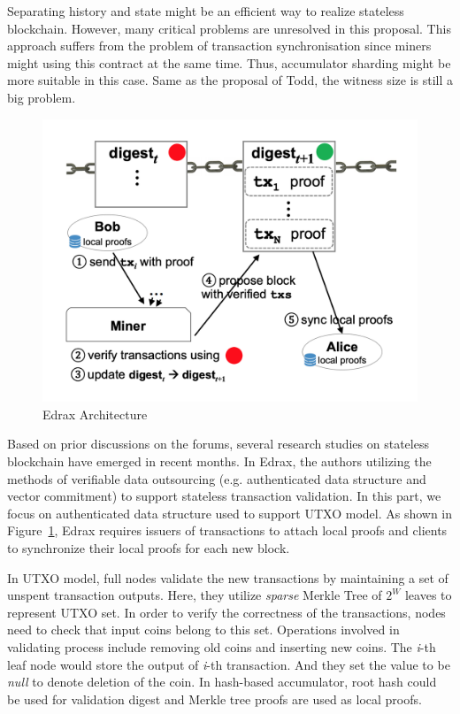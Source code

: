 \documentclass[conference]{IEEEtran}
\begin{document}
Separating history and state might be an efficient way to realize stateless blockchain.
%
However, many critical problems are unresolved in this proposal.
%
This approach suffers from the problem of transaction synchronisation since miners might using this contract at the same time.
%
Thus, accumulator sharding might be more suitable in this case.
%
Same as the proposal of Todd, the witness size is still a big problem.

\begin{figure}[!ht]
  \centering
  \includegraphics[width=\linewidth]{figs/Edrax-arch.png}
  \caption{Edrax Architecture}
  \label{edrax-arch}
\end{figure}

Based on prior discussions on the forums, several research studies on stateless blockchain have emerged in recent months.
%
In Edrax\cite{edrax}, the authors utilizing the methods of verifiable data outsourcing (e.g. authenticated data structure\cite{TKDE:auth-aggregate-queries,SIGMOD18:auth-access-control} and vector commitment\cite{catalano2013vector}) to support stateless transaction validation.
%
In this part, we focus on authenticated data structure used to support UTXO model.
%
As shown in Figure~\ref{edrax-arch}, Edrax requires issuers of transactions to attach local proofs and clients to synchronize their local proofs for each new block.

In UTXO model, full nodes validate the new transactions by maintaining a set of unspent transaction outputs.
%
Here, they utilize \textit{sparse} Merkle Tree of $2^W$ leaves to represent UTXO set. 
%
In order to verify the correctness of the transactions, nodes need to check that input coins belong to this set.
%
Operations involved in validating process include removing old coins and inserting new coins.
%
The \textit{i}-th leaf node would store the output of \textit{i}-th transaction.
%
And they set the value to be \textit{null} to denote deletion of the coin.
%
In hash-based accumulator, root hash could be used for validation digest and Merkle tree proofs are used as local proofs.
\end{document}
